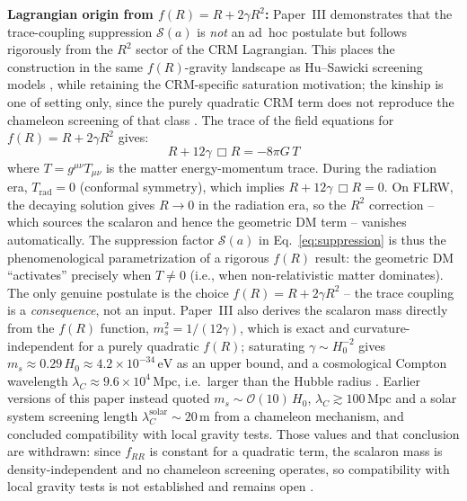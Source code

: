 \documentclass[aps,prd,twocolumn,superscriptaddress,nofootinbib]{revtex4-2}
\begin{document}
\textbf{Lagrangian origin from $f(R) = R + 2\gamma R^2$:} Paper~III \cite{Geiger2026c} demonstrates that the trace-coupling suppression $\mathcal{S}(a)$ is \textit{not} an ad~hoc postulate but follows rigorously from the $R^2$ sector of the CRM Lagrangian. This places the construction in the same $f(R)$-gravity landscape as Hu--Sawicki screening models \cite{HuSawicki2007}, while retaining the CRM-specific saturation motivation; the kinship is one of setting only, since the purely quadratic CRM term does not reproduce the chameleon screening of that class \cite{Geiger2026c}. The trace of the field equations for $f(R) = R + 2\gamma R^2$ gives:
\begin{equation}
R + 12\gamma\,\Box R = -8\pi G\,T
\label{eq:trace_fR}
\end{equation}
where $T = g^{\mu\nu}T_{\mu\nu}$ is the matter energy-momentum trace. During the radiation era, $T_{\mathrm{rad}} = 0$ (conformal symmetry), which implies $R + 12\gamma\,\Box R = 0$. On FLRW, the decaying solution gives $R \to 0$ in the radiation era, so the $R^2$ correction -- which sources the scalaron and hence the geometric DM term -- vanishes automatically. The suppression factor $\mathcal{S}(a)$ in Eq.~\eqref{eq:suppression} is thus the phenomenological parametrization of a rigorous $f(R)$ result: the geometric DM ``activates'' precisely when $T \neq 0$ (i.e., when non-relativistic matter dominates). The only genuine postulate is the choice $f(R) = R + 2\gamma R^2$ -- the trace coupling is a \textit{consequence}, not an input. Paper~III also derives the scalaron mass directly from the $f(R)$ function, $m_s^2 = 1/(12\gamma)$, which is exact and curvature-independent for a purely quadratic $f(R)$; saturating $\gamma \sim H_0^{-2}$ gives $m_s \approx 0.29\,H_0 \approx 4.2 \times 10^{-34}\,\mathrm{eV}$ as an upper bound, and a cosmological Compton wavelength $\lambda_C \approx 9.6 \times 10^{4}\,\mathrm{Mpc}$, i.e.\ larger than the Hubble radius \cite{Geiger2026c}. Earlier versions of this paper instead quoted $m_s \sim \mathcal{O}(10)\,H_0$, $\lambda_C \gtrsim 100\,\mathrm{Mpc}$ and a solar system screening length $\lambda_C^{\mathrm{solar}} \sim 20\,\mathrm{m}$ from a chameleon mechanism, and concluded compatibility with local gravity tests. Those values and that conclusion are withdrawn: since $f_{RR}$ is constant for a quadratic term, the scalaron mass is density-independent and no chameleon screening operates, so compatibility with local gravity tests is not established and remains open \cite{Geiger2026c}.
\end{document}
